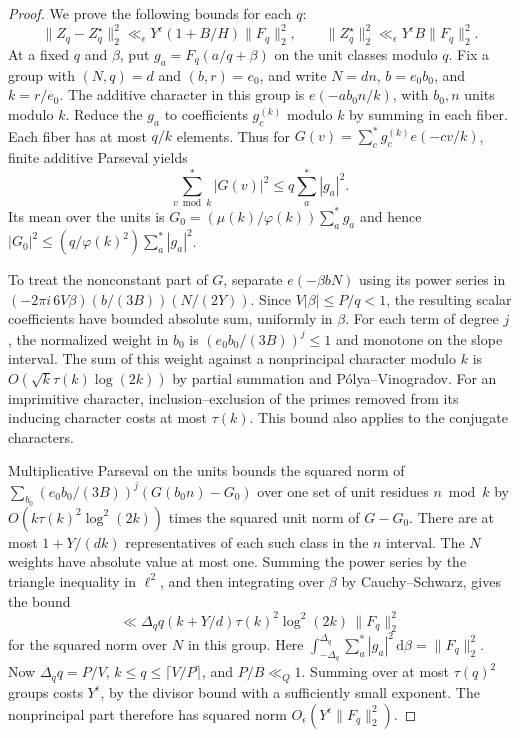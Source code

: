 \documentclass[11pt,a4paper]{article}
\numberwithin{equation}{section}
\newcommand{\ud}{\mathrm d}
\begin{document}
\begin{proof}
We prove the following bounds for each $q$:
\begin{equation}
 \|Z_q-Z_q^\star\|_2^2
   \ll_\epsilon Y^\epsilon(1+B/H)\|F_q\|_2^2,\qquad
 \|Z_q^\star\|_2^2
   \ll_\epsilon Y^\epsilon B\|F_q\|_2^2 .
 \label{eq:criticalgriddenominatorenergy}
\end{equation}
At a fixed $q$ and $\beta$, put $g_a=F_q(a/q+\beta)$
on the unit classes modulo $q$. Fix a group with
$(N,q)=d$ and $(b,r)=e_0$, and write $N=dn$, $b=e_0b_0$,
and $k=r/e_0$. The additive character in this group is
$e(-a b_0 n/k)$, with $b_0,n$ units modulo $k$.
Reduce the $g_a$ to coefficients $g_c^{(k)}$ modulo $k$
by summing in each fiber. Each fiber has at most $q/k$
elements. Thus for $G(v)=\sum_c^* g_c^{(k)}e(-cv/k)$,
finite additive Parseval yields
\[
 \sum_{v\bmod k}^{*}|G(v)|^2\le q\sum_a^*|g_a|^2 .
\]
Its mean over the units is
$G_0=(\mu(k)/\varphi(k))\sum_a^*g_a$ and hence
$|G_0|^2\le (q/\varphi(k)^2)\sum_a^*|g_a|^2$.

To treat the nonconstant part of $G$, separate $e(-\beta bN)$
using its power series in
$(-2\pi i\,6V\beta)(b/(3B))(N/(2Y))$. Since
$V|\beta|\le P/q<1$, the resulting scalar coefficients have
bounded absolute sum, uniformly in $\beta$.
For each term of degree $j$, the normalized weight in $b_0$
is $(e_0b_0/(3B))^j\le1$ and monotone on the slope interval.
The sum of this weight against a nonprincipal character
modulo $k$ is $O(\sqrt{k}\tau(k)\log(2k))$
by partial summation and P\'olya--Vinogradov. For an
imprimitive character, inclusion--exclusion of the primes
removed from its inducing character costs at most $\tau(k)$.
This bound also applies to the conjugate characters.

Multiplicative Parseval on the units bounds the squared norm
of $\sum_{b_0}(e_0b_0/(3B))^j(G(b_0n)-G_0)$ over one set
of unit residues $n\bmod k$ by
$O(k\tau(k)^2\log^2(2k))$ times the squared unit norm of
$G-G_0$. There are at most $1+Y/(dk)$ representatives of
each such class in the $n$ interval. The $N$ weights have
absolute value at most one. Summing the power series by
the triangle inequality in $\ell^2$, and then integrating
over $\beta$ by Cauchy--Schwarz, gives the bound
\[
 \ll \Delta_q q (k+Y/d)\tau(k)^2\log^2(2k)\,\|F_q\|_2^2
\]
for the squared norm over $N$ in this group. Here
$\int_{-\Delta_q}^{\Delta_q}\sum_a^* |g_a|^2\,\ud\beta
=\|F_q\|_2^2$. Now $\Delta_q q=P/V$,
$k\le q\le\lceil V/P\rceil$, and $P/B\ll_Q1$.
Summing over at most $\tau(q)^2$ groups costs $Y^\epsilon$,
by the divisor bound with a sufficiently small exponent.
The nonprincipal part therefore has squared norm
$O_\epsilon(Y^\epsilon\|F_q\|_2^2)$.


\end{proof}
\end{document}
